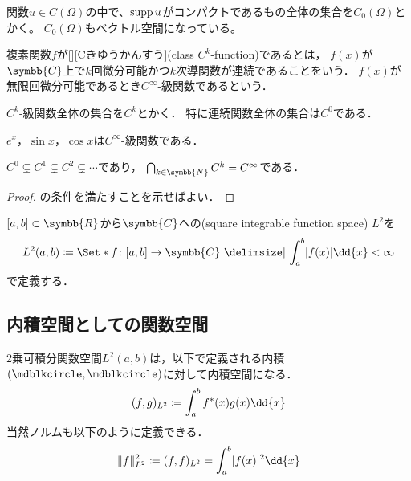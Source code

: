 \documentclass[../sotsu.tex]{subfiles}
\begin{document}
関数$u \in C(\Omega)$の中で、$\operatorname{supp} u$がコンパクトであるもの全体の集合を$C_0 (\Omega)$とかく。
$C_0 (\Omega)$もベクトル空間になっている。


\begin{definition}
    \label{dfn:class-C^k-function}
    複素関数$f$が[][Cきゆうかんすう](class $C^k$-function)であるとは，
    $f(x)$が$\symbb{C}$上で$k$回微分可能かつ$k$次導関数が連続であることをいう．
    $f(x)$が無限回微分可能であるとき$C^\infty$-級関数であるという．

    $C^k$-級関数全体の集合を$C^k$とかく．
    特に連続関数全体の集合は$C^0$である．
\end{definition}

\begin{example}
    $e^x$，$\sin x$，$\cos x$は$C^\infty$-級関数である．
\end{example}

\begin{example}
    $C^0 \subsetneq C^1 \subsetneq C^2 \subsetneq \dotsb$であり，
    $\bigcap_{k \in \symbb{N}} C^k = C^\infty$である．
\end{example}





\begin{proof}
    の条件を満たすことを示せばよい．
\end{proof}


\begin{definition}
    \label{dfn:square-integrable-function-space}
    $[a, b] \subset \symbb{R}$から$\symbb{C}$への(square integrable function space) $L^2$を
    \begin{equation*}
        L^2 (a, b) \coloneq \Set*{ f \colon [a, b] \to \symbb{C}  \given  \int_a^b \abs{f(x)} \dd{x} < \infty }
    \end{equation*}
    で定義する．
\end{definition}



\subsection{内積空間としての関数空間}





\begin{proposition}
    2乗可積分関数空間$L^2 (a, b)$は，以下で定義される内積$(\bigdot, \bigdot)$に対して内積空間になる．
    \begin{align}
        (f, g)_{L^2} \coloneq \int_a^b \conj{f}(x) g(x) \dd{x}
    \end{align}
    当然ノルムも以下のように定義できる．
    \begin{align}
        \norm{f}_{L^2}^2 \coloneq (f, f)_{L^2} = \int_a^b \abs{f(x)}^2 \dd{x}
    \end{align}
\end{proposition}
\end{document}
